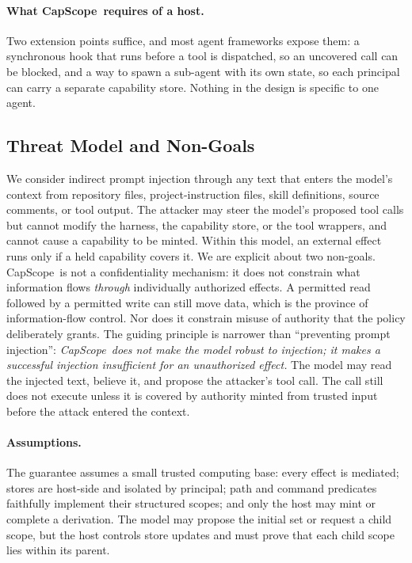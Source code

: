 \documentclass[sigplan,review,anonymous]{acmart}
\newcommand{\tool}{CapScope\xspace}
\begin{document}
  \paragraph{What \tool\ requires of a host.}
  Two extension points suffice, and most agent frameworks expose them: a
  synchronous hook that runs before a tool is dispatched, so an uncovered call
  can be blocked, and a way to spawn a sub-agent with its own state, so each
  principal can carry a separate capability store. Nothing in the design is
  specific to one agent.

  \subsection{Threat Model and Non-Goals}
  \label{sec:threat}
  We consider indirect prompt injection through any text that enters the
  model's context from repository files, project-instruction files, skill
  definitions, source comments, or tool output. The attacker may steer the
  model's proposed tool calls but cannot modify the harness, the capability
  store, or the tool wrappers, and cannot cause a capability to be minted.
  Within this model, an external effect runs only if a held capability covers
  it. We are explicit about two non-goals. \tool\ is not
  a confidentiality mechanism: it does not constrain what information flows
  \emph{through} individually authorized effects. A permitted read
  followed by a permitted write can still move data, which is the province
  of information-flow control. Nor does it constrain misuse of authority
  that the policy deliberately grants. The guiding principle is narrower than
  ``preventing prompt injection'': \emph{\tool\ does not make the model
  robust to injection; it makes a successful injection insufficient for an
  unauthorized effect.} The model may read the injected text, believe it,
  and propose the attacker's tool call. The call still does not execute
  unless it is covered by authority minted from trusted input before the
  attack entered the context.

  \paragraph{Assumptions.}
  The guarantee assumes a small trusted computing base: every effect is
  mediated; stores are host-side and isolated by principal; path and command
  predicates faithfully implement their structured scopes; and only the host may
  mint or complete a derivation. The model may propose the initial set or request
  a child scope, but the host controls store updates and must prove that each
  child scope lies within its parent.
\end{document}
